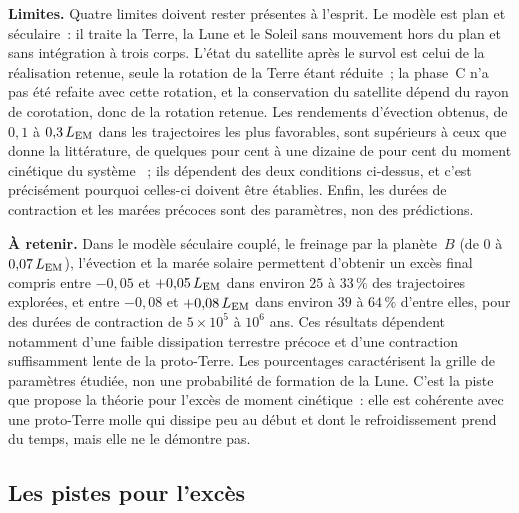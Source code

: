 \documentclass[11pt,a4paper]{article}
\newcommand{\LEM}{\ensuremath{L_{\rm EM}}}
\begin{document}
\textbf{Limites.} Quatre limites doivent rester présentes à l'esprit. Le modèle est plan et séculaire~: il traite la Terre, la Lune et le Soleil sans mouvement hors du plan et sans intégration à trois corps. L'état du satellite après le survol est celui de la réalisation retenue, seule la rotation de la Terre étant réduite~; la phase~C n'a pas été refaite avec cette rotation, et la conservation du satellite dépend du rayon de corotation, donc de la rotation retenue. Les rendements d'évection obtenus, de $0{,}1$ à $0{,}3\,\LEM$ dans les trajectoires les plus favorables, sont supérieurs à ceux que donne la littérature, de quelques pour cent à une dizaine de pour cent du moment cinétique du système \citep{WardCanupRufu2020,RufuCanup2020}~; ils dépendent des deux conditions ci-dessus, et c'est précisément pourquoi celles-ci doivent être établies. Enfin, les durées de contraction et les marées précoces sont des paramètres, non des prédictions.

\textbf{À retenir.} Dans le modèle séculaire couplé, le freinage par la planète~$B$ (de $0$ à $0{,}07\,\LEM$), l'évection et la marée solaire permettent d'obtenir un excès final compris entre $-0{,}05$ et $+0{,}05\,\LEM$ dans environ $25$ à $33\,\%$ des trajectoires explorées, et entre $-0{,}08$ et $+0{,}08\,\LEM$ dans environ $39$ à $64\,\%$ d'entre elles, pour des durées de contraction de $5\times10^5$ à $10^6$ ans. Ces résultats dépendent notamment d'une faible dissipation terrestre précoce et d'une contraction suffisamment lente de la proto-Terre. Les pourcentages caractérisent la grille de paramètres étudiée, non une probabilité de formation de la Lune. C'est la piste que propose la théorie pour l'excès de moment cinétique~: elle est cohérente avec une proto-Terre molle qui dissipe peu au début et dont le refroidissement prend du temps, mais elle ne le démontre pas.

\subsection{Les pistes pour l'excès}
\label{sec:pistes}
\end{document}
